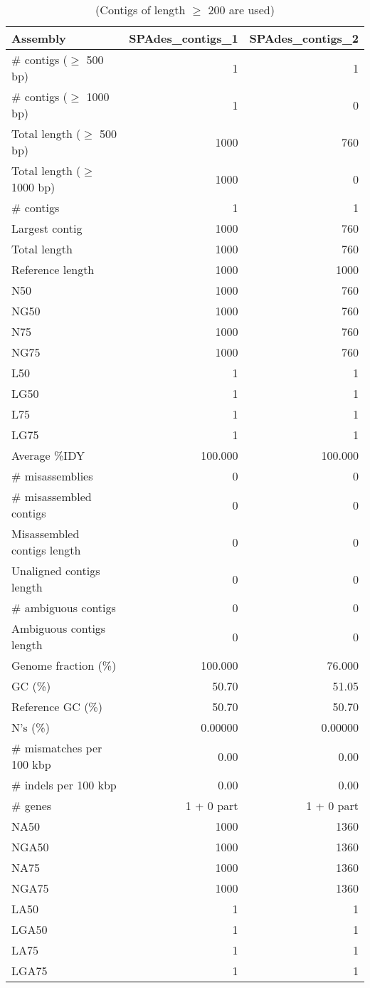 \begin{table}[ht]
\begin{center}
\caption{(Contigs of length $\geq$ 200 are used)}
\begin{tabular}{|l*{2}{|r}|}
\hline
Assembly & SPAdes\_contigs\_1 & SPAdes\_contigs\_2 \\ \hline
\# contigs ($\geq$ 500 bp) & 1 & 1 \\ \hline
\# contigs ($\geq$ 1000 bp) & 1 & 0 \\ \hline
Total length ($\geq$ 500 bp) & 1000 & 760 \\ \hline
Total length ($\geq$ 1000 bp) & 1000 & 0 \\ \hline
\# contigs & 1 & 1 \\ \hline
Largest contig & 1000 & 760 \\ \hline
Total length & 1000 & 760 \\ \hline
Reference length & 1000 & 1000 \\ \hline
N50 & 1000 & 760 \\ \hline
NG50 & 1000 & 760 \\ \hline
N75 & 1000 & 760 \\ \hline
NG75 & 1000 & 760 \\ \hline
L50 & 1 & 1 \\ \hline
LG50 & 1 & 1 \\ \hline
L75 & 1 & 1 \\ \hline
LG75 & 1 & 1 \\ \hline
Average \%IDY & 100.000 & 100.000 \\ \hline
\# misassemblies & 0 & 0 \\ \hline
\# misassembled contigs & 0 & 0 \\ \hline
Misassembled contigs length & 0 & 0 \\ \hline
Unaligned contigs length & 0 & 0 \\ \hline
\# ambiguous contigs & 0 & 0 \\ \hline
Ambiguous contigs length & 0 & 0 \\ \hline
Genome fraction (\%) & 100.000 & 76.000 \\ \hline
GC (\%) & 50.70 & 51.05 \\ \hline
Reference GC (\%) & 50.70 & 50.70 \\ \hline
N's (\%) & 0.00000 & 0.00000 \\ \hline
\# mismatches per 100 kbp & 0.00 & 0.00 \\ \hline
\# indels per 100 kbp & 0.00 & 0.00 \\ \hline
\# genes & 1 + 0 part & 1 + 0 part \\ \hline
NA50 & 1000 & 1360 \\ \hline
NGA50 & 1000 & 1360 \\ \hline
NA75 & 1000 & 1360 \\ \hline
NGA75 & 1000 & 1360 \\ \hline
LA50 & 1 & 1 \\ \hline
LGA50 & 1 & 1 \\ \hline
LA75 & 1 & 1 \\ \hline
LGA75 & 1 & 1 \\ \hline
\end{tabular}
\end{center}
\end{table}
